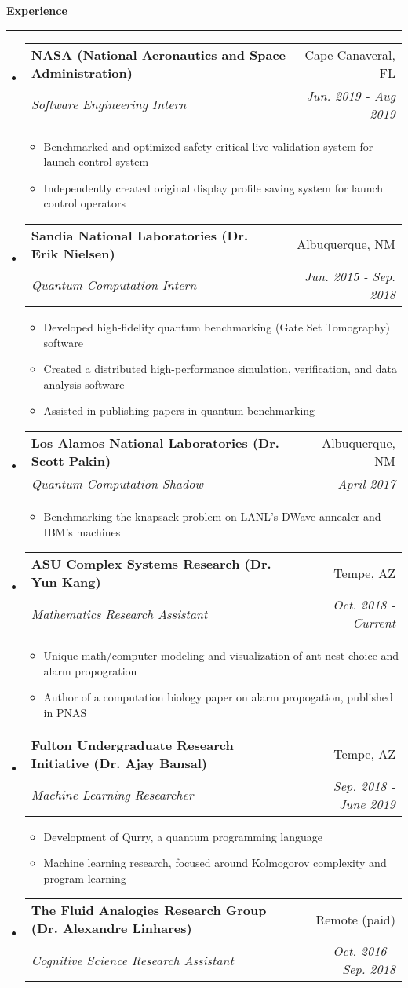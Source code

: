 \documentclass[letterpaper,11pt]{article}
\makeatletter
\newcommand{\sectionline}{
    \noindent\rule[0.5ex]{\linewidth}{0.5pt}
}
\newcommand{\resitem}[1]{\item #1 \vspace{-3pt}}
\newcommand{\resheading}[1]{
    {\large \textbf{#1}}
    \sectionline
}
\newcommand{\colfill}{@{\extracolsep{\fill}}}
\newcommand{\ressubheading}[4]{
\begin{tabular*}{6.5in}{l\colfill r}
		\textbf{#1} & #2 \\
		\textit{#3} & \textit{#4} \\
\end{tabular*}\vspace{-6pt}}
\makeatother
\begin{document}
\resheading{Experience}
\begin{itemize}
 \item
     \ressubheading{NASA (National Aeronautics and Space Administration)}{Cape Canaveral, FL}{Software Engineering Intern}{Jun. 2019 - Aug 2019}
 	\begin{itemize}
        \resitem{Benchmarked and optimized safety-critical live validation system for launch control system}
 		\resitem{Independently created original display profile saving system for launch control operators}
 	\end{itemize}
 \item
    \ressubheading{Sandia National Laboratories (Dr. Erik Nielsen)}{Albuquerque, NM}{Quantum Computation Intern}{Jun. 2015 - Sep. 2018}
 	\begin{itemize}
        \resitem{Developed high-fidelity quantum benchmarking (Gate Set Tomography) software}
 		\resitem{Created a distributed high-performance simulation, verification, and data analysis software}
 		\resitem{Assisted in publishing papers in quantum benchmarking}
 	\end{itemize}
 \item
     \ressubheading{Los Alamos National Laboratories (Dr. Scott Pakin)}{Albuquerque, NM}{Quantum Computation Shadow}{April 2017}
 	\begin{itemize}
 		\resitem{Benchmarking the knapsack problem on LANL's DWave annealer and IBM's machines}
 	\end{itemize}
 \item
    \ressubheading{ASU Complex Systems Research (Dr. Yun Kang)}{Tempe, AZ}{Mathematics Research Assistant}{Oct. 2018 - Current}
 	\begin{itemize}
 		\resitem{Unique math/computer modeling and visualization of ant nest choice and alarm propogration}
        \resitem{Author of a computation biology paper on alarm propogation, published in PNAS}
 	\end{itemize}
 \item
     \ressubheading{Fulton Undergraduate Research Initiative (Dr. Ajay Bansal)}{Tempe, AZ}{Machine Learning Researcher}{Sep. 2018 - June 2019}
 	\begin{itemize}
        \resitem{Development of Qurry, a quantum programming language}
        \resitem{Machine learning research, focused around Kolmogorov complexity and program learning}
 	\end{itemize}
 \item
    \ressubheading{The Fluid Analogies Research Group (Dr. Alexandre Linhares)}{Remote (paid)}{Cognitive Science Research Assistant}{Oct. 2016 - Sep. 2018}

\end{itemize}
\end{document}
